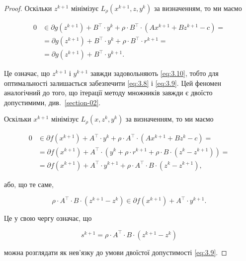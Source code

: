 \begin{proof}
    Оскільки $z^{k + 1}$ мінімізує $L_\rho \left( x^{k + 1}, z, y^k \right)$ за визначенням, то ми маємо
    
    \begin{align}
    	0 &\in  \partial g \left( z^{k + 1} \right) + B^\intercal \cdot y^k + \rho \cdot B^\intercal \cdot \left( A x^{k + 1} + B z^{k + 1} - c \right) = \\
    	&= \partial g \left( z^{k + 1} \right) + B^\intercal \cdot y^k + \rho \cdot B^\intercal \cdot r^{k + 1} = \\
    	&= \partial g \left( z^{k + 1} \right) + B^\intercal \cdot y^{k + 1}.
    \end{align}
    
    Це означає, що $z^{k + 1}$ і $y^{k + 1}$ завжди задовольняють \eqref{eq:3.10}, тобто для оптимальності залишається забезпечити \eqref{eq:3.8} і \eqref{eq:3.9}. Цей феномен аналогічний до того, що ітерації методу множників завжди є двоїсто допустимими, див.~\ref{section-02}. \medskip
    
    Оскільки $x^{k + 1}$ мінімізує $L_\rho \left( x, z^k, y^k \right)$ за визначенням, то ми маємо
    
    \begin{align}
    	0 &\in \partial f \left( x^{k + 1} \right) + A^\intercal \cdot y^k + \rho \cdot A^\intercal \cdot \left( A x^{k + 1} + B z^k - c \right) = \\
    	&= \partial f \left( x^{k + 1} \right) + A^\intercal \cdot \left( y^k + \rho \cdot r^{k + 1} + \rho \cdot B \cdot \left( z^k - z^{k + 1} \right)\right) = \\
    	&= \partial f \left( x^{k + 1} \right) + A^\intercal \cdot y^{k + 1} + \rho \cdot A^\intercal \cdot B \cdot \left( z^k - z^{k + 1} \right),
    \end{align}
    
    або, що те саме,
    
    \begin{equation}
    	\rho \cdot A^\intercal \cdot B \cdot \left( z^{k + 1} - z^k \right) \in \partial f \left( x^{k + 1} \right) + A^\intercal \cdot y^{k + 1}.
    \end{equation}
    
    Це у свою чергу означає, що 
    
    \begin{equation}
    	s^{k + 1} = \rho \cdot A^\intercal \cdot B \cdot \left( z^{k + 1} - z^k \right)
    \end{equation}
    
    можна розглядати як нев'язку до умови двоїстої допустимості \eqref{eq:3.9}.
\end{proof}

